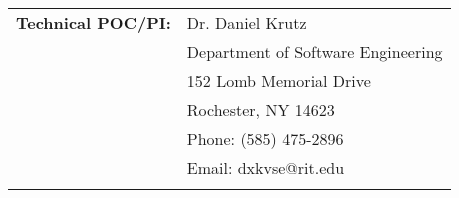 \documentclass[12pt]{article}
\begin{document}
\begin{titlepage}
\begin{tabular}{ L{50mm} L{100mm} }
\normalsize \textbf{Technical POC/PI:} & \normalsize  Dr. Daniel Krutz \\
 & \vspace{-2mm} \normalsize Department of Software Engineering
 \\

   & \vspace{-4mm} \normalsize 152 Lomb Memorial Drive \\
   & \vspace{-6mm} \normalsize Rochester, NY 14623 \\
   & \vspace{-8mm} \normalsize Phone: (585) 475-2896 \\
   & \vspace{-10mm} \normalsize Email: dxkvse@rit.edu \\
   
   
   
 \\

   
   
   
   
   



\end{tabular}
\end{titlepage}
\end{document}
